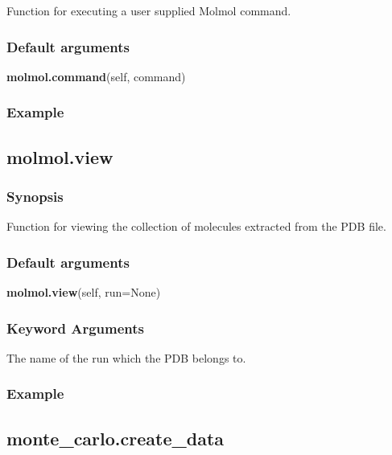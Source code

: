 Function for executing a user supplied Molmol command.

\subsubsection{Default arguments}

\textsf{\textbf{molmol.command}(self, command)}


\subsubsection{Example}




\newpage

\subsection{molmol.view}


\subsubsection{Synopsis}

Function for viewing the collection of molecules extracted from the PDB file.

\subsubsection{Default arguments}

\textsf{\textbf{molmol.view}(self, run=None)}


\subsubsection{Keyword Arguments}

  The name of the run which the PDB belongs to.

\subsubsection{Example}





\newpage

\subsection{monte\_carlo.create\_data}


